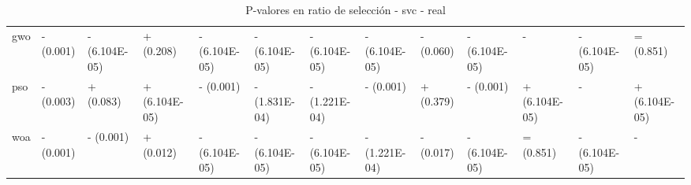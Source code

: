 \begin{table}
\begin{adjustbox}{width=\linewidth}
\begin{tabular}{lllllllllllll}
            gwo   & - (0.001)     & - (6.104E-05) & + (0.208)     & - (6.104E-05) & - (6.104E-05) & - (6.104E-05) & - (6.104E-05) & - (0.060)     & - (6.104E-05) & -             & - (6.104E-05) & = (0.851)     \\
            pso   & - (0.003)     & + (0.083)     & + (6.104E-05) & - (0.001)     & - (1.831E-04) & - (1.221E-04) & - (0.001)     & + (0.379)     & - (0.001)     & + (6.104E-05) & -             & + (6.104E-05) \\
            woa   & - (0.001)     & - (0.001)     & + (0.012)     & - (6.104E-05) & - (6.104E-05) & - (6.104E-05) & - (1.221E-04) & - (0.017)     & - (6.104E-05) & = (0.851)     & - (6.104E-05) & -             \\
            \bottomrule
        \end{tabular}
    \end{adjustbox}
    \caption{P-valores en ratio de selección - svc - real}
    \label{tab:p-values_sel_ratio_real_svc}
\end{table}

